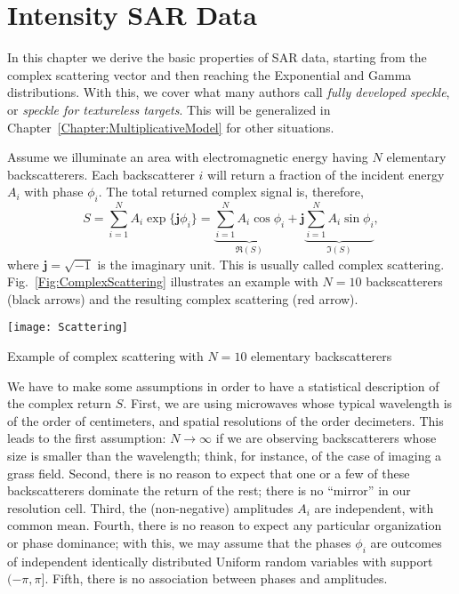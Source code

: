 \chapter{Intensity SAR Data}\label{Chapter:DataFormation}

In this chapter we derive the basic properties of SAR data, starting from the complex scattering vector and then reaching the Exponential and Gamma distributions.
With this, we cover what many authors call \textit{fully developed speckle}, or \textit{speckle for textureless targets}.
This will be generalized in Chapter~\ref{Chapter:MultiplicativeModel} for other situations.

Assume we illuminate an area with electromagnetic energy having $N$ elementary backscatterers.
Each backscatterer $i$ will return a fraction of the incident energy $A_i$ with phase $\phi_i$.
The total returned complex signal is, therefore,
\begin{equation}
S = \sum_{i=1}^{N} A_i \exp\{\mathbf j \phi_i\} = 
\underbrace{{\sum_{i=1}^{N} A_i \cos \phi_i}}_{\Re(S)} +\mathbf j \underbrace{ \sum_{i=1}^{N} A_i \sin \phi_i}_{\Im(S)}, 
\end{equation}
where $\mathbf j=\sqrt{-1}$ is the imaginary unit.
This is usually called complex scattering.
Fig.~\ref{Fig:ComplexScattering} illustrates an example with $N=10$ backscatterers (black arrows) and the resulting complex scattering (red arrow).

\begin{marginfigure}
\texttt{[image: Scattering]}
\caption{Example of complex scattering with $N=10$ elementary backscatterers}\label{Fig:ComplexScattering}
\end{marginfigure}

We have to make some assumptions in order to have a statistical description of the complex return $S$.
First, we are using microwaves whose typical wavelength is of the order of centimeters, and spatial resolutions of the order decimeters.
This leads to the first assumption: $N\to\infty$ if we are observing backscatterers whose size is smaller than the wavelength; think, for instance, of the case of imaging a grass field.
Second, there is no reason to expect that one or a few of these backscatterers dominate the return of the rest; there is no ``mirror'' in our resolution cell.
Third, the (non-negative) amplitudes $A_i$ are independent, with common mean.
Fourth, there is no reason to expect any particular organization or phase dominance; with this, we may assume that the phases $\phi_i$ are outcomes of independent identically distributed Uniform random variables with support $(-\pi,\pi]$.
Fifth, there is no association between phases and amplitudes.

